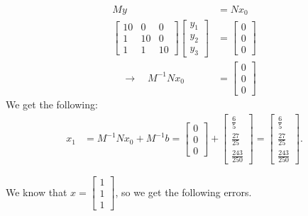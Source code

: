 \documentclass[12pt]{article}
\begin{document}
\begin{align*}
    My &= Nx_0 \\
    \begin{bmatrix} 10 & 0 & 0 \\ 1 & 10 & 0 \\ 1 & 1 & 10 \end{bmatrix} \begin{bmatrix} y_1 \\ y_2 \\ y_3 \end{bmatrix} &= \begin{bmatrix} 0 \\ 0 \\ 0 \end{bmatrix} \\
    \quad\longrightarrow\quad M^{-1}Nx_0 &= \begin{bmatrix} 0 \\ 0 \\ 0 \end{bmatrix}
\end{align*}
We get the following:
\begin{align*}
    x_1 &= M^{-1}Nx_0 + M^{-1}b
    = \begin{bmatrix} 0 \\[1.5ex] 0 \\[1.5ex] 0 \end{bmatrix} + \begin{bmatrix} \frac{6}{5} \\[1.5ex] \frac{27}{25} \\[1.5ex] \frac{243}{250} \end{bmatrix}
    = \begin{bmatrix} \frac{6}{5} \\[1.5ex] \frac{27}{25} \\[1.5ex] \frac{243}{250} \end{bmatrix}.
\end{align*}

\newpage
We know that $x=\begin{bmatrix} 1 \\ 1 \\ 1 \end{bmatrix}$, so we get the following errors.
\end{document}
